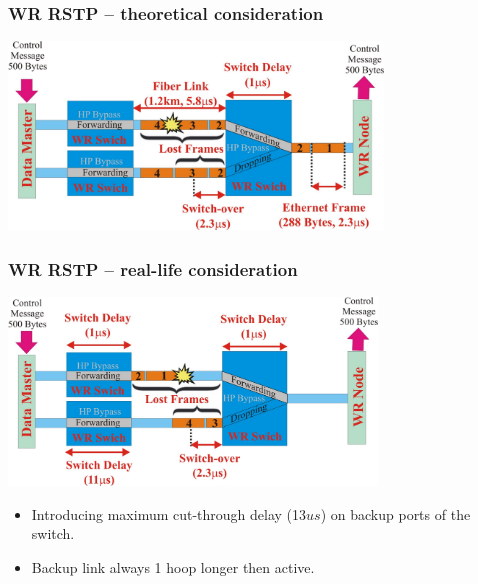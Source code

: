 \documentclass[]{beamer}
\begin{document}
\begin{frame}
  \frametitle{WR RSTP -- theoretical consideration}   

\centering
\includegraphics[height=5cm,keepaspectratio]{robustness/RSTPsimple.pdf}

\end{frame}
\begin{frame}
  \frametitle{WR RSTP -- real-life consideration}   

\centering
\includegraphics[height=5cm,keepaspectratio]{robustness/RSTPcomplex2.pdf}

  \begin{itemize}
    \item Introducing maximum cut-through delay (13$us$) on backup ports of the
          switch.
    \item Backup link always 1 hoop longer then active.
  \end{itemize}

\end{frame}
\end{document}
